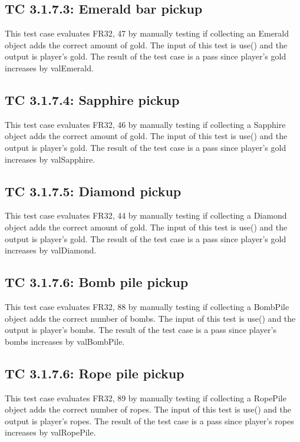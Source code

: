 \documentclass[12pt, titlepage]{article}
\begin{document}
\subsection*{TC 3.1.7.3: Emerald bar pickup}

This test case evaluates FR32, 47 by manually testing if collecting an Emerald object adds the correct amount of gold. The input of this test is use() and the output is player's gold. The result of the test case is a pass since player's gold increases by valEmerald.

\subsection*{TC 3.1.7.4: Sapphire pickup}

This test case evaluates FR32, 46 by manually testing if collecting a Sapphire object adds the correct amount of gold. The input of this test is use() and the output is player's gold. The result of the test case is a pass since player's gold increases by valSapphire.

\subsection*{TC 3.1.7.5: Diamond pickup}

This test case evaluates FR32, 44 by manually testing if collecting a Diamond object adds the correct amount of gold. The input of this test is use() and the output is player's gold. The result of the test case is a pass since player's gold increases by valDiamond.

\subsection*{TC 3.1.7.6: Bomb pile pickup}

This test case evaluates FR32, 88 by manually testing if collecting a BombPile object adds the correct number of bombs. The input of this test is use() and the output is player's bombs. The result of the test case is a pass since player's bombs increases by valBombPile.

\subsection*{TC 3.1.7.6: Rope pile pickup}

This test case evaluates FR32, 89 by manually testing if collecting a RopePile object adds the correct number of ropes. The input of this test is use() and the output is player's ropes. The result of the test case is a pass since player's ropes increases by valRopePile.
\end{document}
